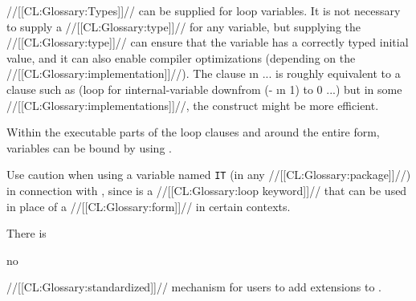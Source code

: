 \endsubSection%


//[[CL:Glossary:Types]]// can be supplied for loop variables.   It is not necessary to supply a //[[CL:Glossary:type]]// for any variable, but supplying the //[[CL:Glossary:type]]//  can ensure that the variable has a correctly typed initial value, and it can also enable compiler optimizations  (depending on the //[[CL:Glossary:implementation]]//).
  The clause  \i{n} ... is roughly equivalent to a clause such as 
   \code
 (loop for \i{internal-variable} downfrom (- \i{n} 1) to 0 ...) \endcode
                                                             but in some //[[CL:Glossary:implementations]]//, the  construct might be more efficient.

Within the executable parts of the loop clauses and around the entire  form, variables can be bound by using .

 Use caution when using a variable named {\tt IT} (in any //[[CL:Glossary:package]]//) in connection with , since  is a //[[CL:Glossary:loop keyword]]//  that can be used in place of a //[[CL:Glossary:form]]// in certain contexts.

There is

 no

//[[CL:Glossary:standardized]]// mechanism for users to add extensions to .

\endsubSection%
